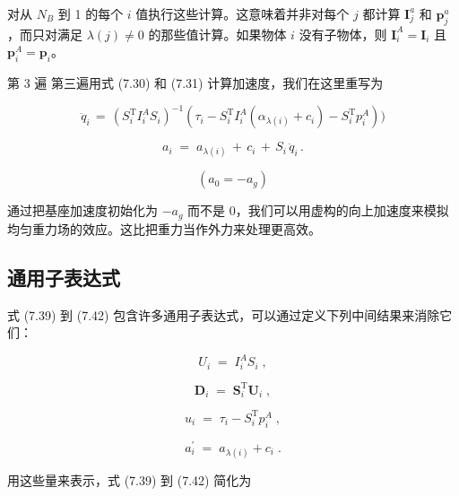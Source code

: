 \documentclass[10pt,a4paper]{book}
\theoremstyle{thmstyle} %
\theoremstyle{defstyle} %
\theoremstyle{prostyle} %
\begin{document}
对从 $N_B$ 到 1 的每个 $i$ 值执行这些计算。这意味着并非对每个 $j$ 都计算 $\boldsymbol{I}_j^a$ 和 $\boldsymbol{p}_j^a$，而只对满足 $\lambda(j) \neq 0$ 的那些值计算。如果物体 $i$ 没有子物体，则 $\boldsymbol{I}_i^A = \boldsymbol{I}_i$ 且 $\boldsymbol{p}_i^A = \boldsymbol{p}_i$。



第 3 遍 第三遍用式 (7.30) 和 (7.31) 计算加速度，我们在这里重写为



$$
\ddot { q } _ { i } \, = \, ( S _ { i } ^{\mathrm { T} } I _ { i } ^{A} S _ { i } ) ^{- 1} ( \tau _ { i } - S _ { i } ^{\mathrm { T} } I _ { i } ^{A} \left( \alpha _ { \lambda ( i ) } + c _ { i } \right) - S _ { i } ^{\mathrm { T} } p _ { i } ^{A} ) )
$$



$$
a _ { i } \; = \; a _ { \lambda ( i ) } \, + \, c _ { i } \, + \, S _ { i } \, \ddot { q } _ { i } \, .
$$



$$
( a _ { 0 } = - a _ { g } )
$$



通过把基座加速度初始化为 $-a_{g}$ 而不是 0，我们可以用虚构的向上加速度来模拟均匀重力场的效应。这比把重力当作外力来处理更高效。



\subsection{通用子表达式}





式 (7.39) 到 (7.42) 包含许多通用子表达式，可以通过定义下列中间结果来消除它们：



$$
U _ { i } \; = \; I _ { i } ^{A} S _ { i } \; ,
$$



$$
{ \boldsymbol { D } } _ { i } \; = \; { \boldsymbol { S } } _ { i } ^{\mathrm { T} } { \boldsymbol { U } } _ { i } \; ,
$$



$$
u _ { i } \; = \; \tau _ { i } - S _ { i } ^{\mathrm { T} } p _ { i } ^{A} \; ,
$$



$$
a _ { i } ^{\prime} \; = \; a _ { \lambda ( i ) } + c _ { i } \; .
$$



用这些量来表示，式 (7.39) 到 (7.42) 简化为
\end{document}
